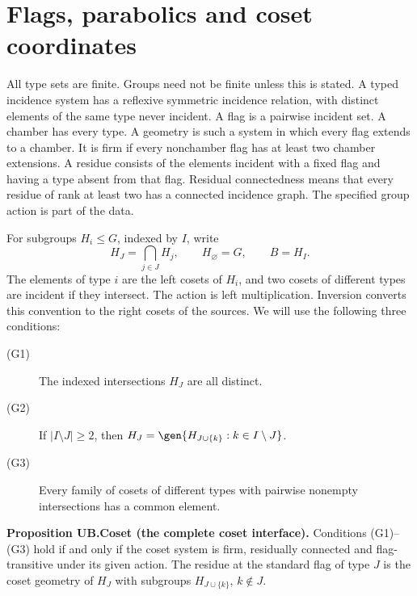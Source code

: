 \section{Flags, parabolics and coset coordinates}
All type sets are finite. Groups need not be finite unless this is stated.
A typed incidence system has a reflexive symmetric incidence relation,
with distinct elements of the same type never incident. A flag is a
pairwise incident set. A chamber has every type. A geometry is such a
system in which every flag extends to a chamber. It is firm if every
nonchamber flag has at least two chamber extensions. A residue consists of
the elements incident with a fixed flag and having a type absent from
that flag. Residual connectedness means that every residue of rank at
least two has a connected incidence graph. The specified group action
is part of the data.

For subgroups $H_i\leq G$, indexed by $I$, write
\[
 H_J=\bigcap_{j\in J}H_j,\qquad H_\varnothing=G,\qquad B=H_I.
\]
The elements of type $i$ are the left cosets of $H_i$, and two cosets of
different types are incident if they intersect. The action is left
multiplication. Inversion converts this convention to the right cosets
of the sources. We will use the following three conditions:
\begin{description}
\item[(G1)] The indexed intersections $H_J$ are all distinct.
\item[(G2)] If $|I\setminus J|\geq2$, then
$H_J=\gen{H_{J\cup\{k\}}:k\in I\setminus J}$.
\item[(G3)] Every family of cosets of different types with pairwise
nonempty intersections has a common element.
\end{description}

\noindent\textbf{Proposition UB.Coset (the complete coset interface).}
Conditions (G1)--(G3) hold if and only if the coset system is firm,
residually connected and flag-transitive under its given action.
The residue at the standard flag of type $J$ is the coset geometry of
$H_J$ with subgroups $H_{J\cup\{k\}}$, $k\notin J$.

